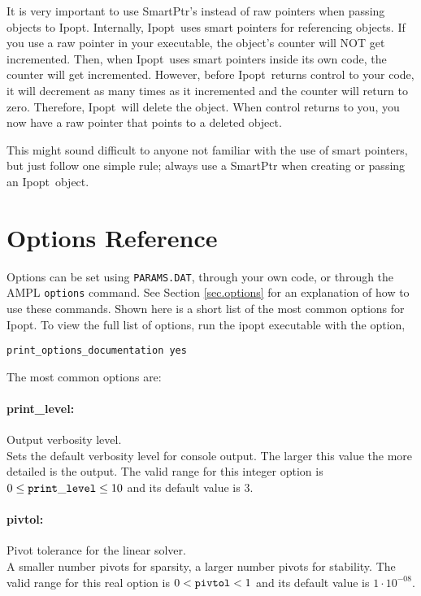 \documentclass[letter,10pt]{article}
\newcommand{\Ipopt}{{\sc Ipopt}}
\begin{document}
It is very important to use SmartPtr's instead of raw pointers when
passing objects to \Ipopt. Internally, \Ipopt\ uses smart pointers for
referencing objects. If you use a raw pointer in your executable, the
object's counter will NOT get incremented. Then, when \Ipopt\ uses smart
pointers inside its own code, the counter will get
incremented. However, before \Ipopt\ returns control to your code, it
will decrement as many times as it incremented and the counter will
return to zero. Therefore, \Ipopt\ will delete the object. When control
returns to you, you now have a raw pointer that points to a deleted
object.

This might sound difficult to anyone not familiar with the use of
smart pointers, but just follow one simple rule; always use a SmartPtr
when creating or passing an \Ipopt\ object.

\newpage
\section{Options Reference} \label{app.options_ref}
Options can be set using {\tt PARAMS.DAT}, through your own code, or through the 
AMPL {\tt options} command. See Section \ref{sec.options} for an explanation of
how to use these commands.
Shown here is a short list of the most common options for Ipopt. To view
the full list of options, run the ipopt executable with the option,
\begin{verbatim}
print_options_documentation yes
\end{verbatim}

The most common options are:


\paragraph{print\_level:} Output verbosity level. $\;$ \\
 Sets the default verbosity level for console
output. The larger this value the more detailed
is the output. The valid range for this integer option is
$0 \le {\tt print\_level } \le 10$
and its default value is $3$.


\paragraph{pivtol:} Pivot tolerance for the linear solver. $\;$ \\
 A smaller number pivots for sparsity, a larger
number pivots for stability. The valid range for this real option is 
$0 <  {\tt pivtol } <  1$
and its default value is $1 \cdot 10^{-08}$.
\end{document}
